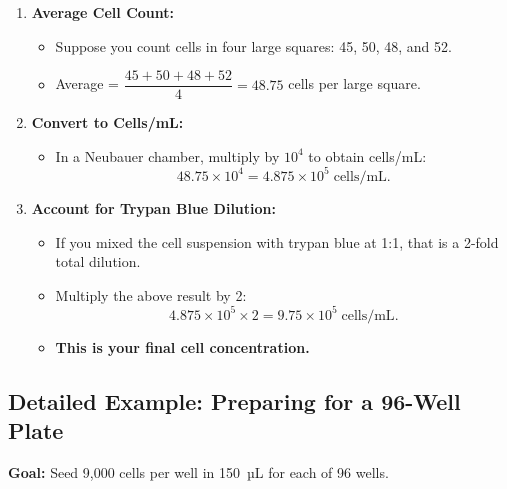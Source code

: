 \documentclass[11pt]{article}
\begin{document}
\begin{enumerate}[leftmargin=*]
    \item \textbf{Average Cell Count:}
    \begin{itemize}[leftmargin=*]
        \item Suppose you count cells in four large squares: 45, 50, 48, and 52.
        \item Average = \(\dfrac{45 + 50 + 48 + 52}{4} = 48.75\) cells per large square.
    \end{itemize}

    \item \textbf{Convert to Cells/mL:}
    \begin{itemize}[leftmargin=*]
        \item In a Neubauer chamber, multiply by \(10^4\) to obtain cells/mL:
        \[
            48.75 \times 10^4 = 4.875 \times 10^5 \; \text{cells/mL}.
        \]
    \end{itemize}

    \item \textbf{Account for Trypan Blue Dilution:}
    \begin{itemize}[leftmargin=*]
        \item If you mixed the cell suspension with trypan blue at 1:1, that is a 2-fold total dilution.
        \item Multiply the above result by 2:
        \[
            4.875 \times 10^5 \times 2 = 9.75 \times 10^5 \;\text{cells/mL}.
        \]
        \item \textbf{This is your final cell concentration.}
    \end{itemize}

\end{enumerate}

\subsection{Detailed Example: Preparing for a 96-Well Plate}

\textbf{Goal:} Seed 9,000 cells per well in 150~µL for each of 96 wells.
\end{document}
